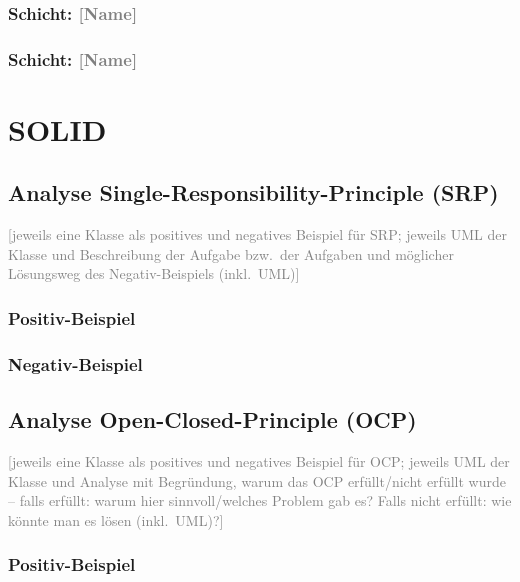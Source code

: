 \documentclass[a4paper,12pt]{article}
\newcommand{\placeholder}[1]{\textcolor{gray}{[#1]}}
\begin{document}
\subsubsection*{Schicht: \placeholder{Name}}

\subsubsection*{Schicht: \placeholder{Name}}

\section{SOLID}

\subsection*{Analyse Single-Responsibility-Principle (SRP)}

\placeholder{jeweils eine Klasse als positives und negatives Beispiel für SRP;
    jeweils UML der Klasse und Beschreibung der Aufgabe bzw.\ der Aufgaben und möglicher Lösungsweg
    des Negativ-Beispiels (inkl.\ UML)}

\subsubsection*{Positiv-Beispiel}

\subsubsection*{Negativ-Beispiel}

\newpage

\subsection*{Analyse Open-Closed-Principle (OCP)}

\placeholder{jeweils eine Klasse als positives und negatives Beispiel für OCP;
    jeweils UML der Klasse und Analyse mit Begründung, warum das OCP erfüllt/nicht erfüllt wurde –
    falls erfüllt: warum hier sinnvoll/welches Problem gab es? Falls nicht erfüllt: wie könnte man
    es lösen (inkl.\ UML)?}

\subsubsection*{Positiv-Beispiel}
\end{document}
